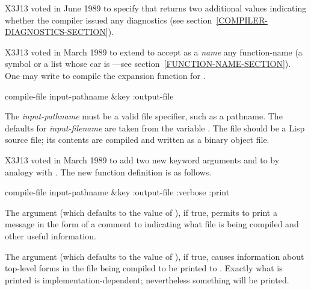\begin{defun}[Function]
\begin{newer}
X3J13 voted in June 1989  to specify that
 returns two additional values
indicating whether the compiler issued any diagnostics
(see section~\ref{COMPILER-DIAGNOSTICS-SECTION}).
\end{newer}

\begin{newer}
X3J13 voted in March 1989  to extend 
to accept as a {\it name} any function-name (a symbol or a list
whose car is ---see section~\ref{FUNCTION-NAME-SECTION}).
One may write  to compile the 
expansion function for .
\end{newer}
\end{defun}

\begin{obsolete}
\begin{defun}[Function]
compile-file input-pathname &key :output-file

The {\it input-pathname} must be a valid file specifier, such as a pathname.
The defaults for {\it input-filename} are taken from the variable
.
The file should be a Lisp source file;
its contents are compiled and written as a binary object file.
\end{defun}
\end{obsolete}

\begin{newer}
X3J13 voted in March 1989  to add two new
keyword arguments  and 
to  by analogy with .
The new function definition is as follows.

\begin{defun}[Function]
compile-file input-pathname &key :output-file :verbose :print

The  argument (which defaults to the value of
), if true, permits  to print a message
in the form of a comment to  indicating what file is
being compiled and other useful information.

The  argument (which defaults to the value of ),
if true, causes information about top-level forms in the file being
compiled to be printed to .  Exactly what is printed
is implementation-dependent; nevertheless something will be printed.
\end{defun}
\end{newer}

